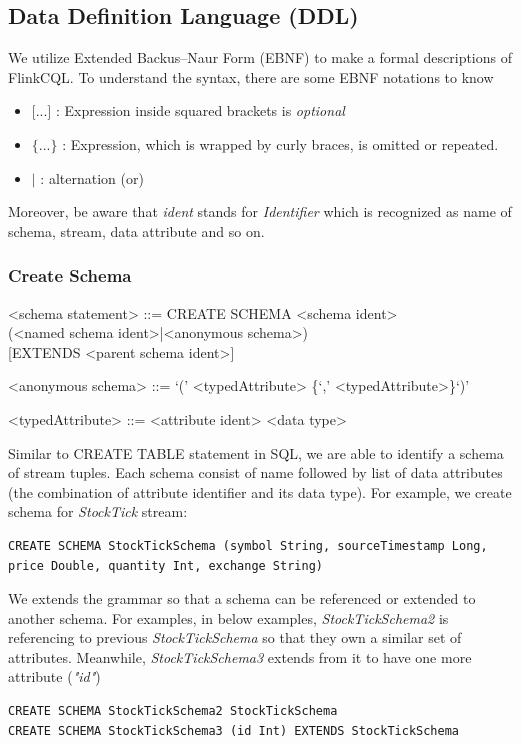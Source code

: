 \subsection{Data Definition Language (DDL)}
We utilize Extended Backus–Naur Form (EBNF) to make a formal descriptions of FlinkCQL. To understand the syntax, there are some EBNF notations to know
\begin{itemize}
	\item $\textbf{[...]}$ : Expression inside squared brackets is \textit{optional}
	\item $\textbf{\{...\}}$ : Expression, which is wrapped by curly braces, is omitted or repeated. 
	\item $\textbf{|}$ : alternation (or)
\end{itemize} 
Moreover, be aware that \textit{ident} stands for \textit{Identifier} which is recognized as name of schema, stream, data attribute and so on.
\subsubsection{Create Schema}

\setlength{\grammarindent}{12em} %

\begin{grammar}

<schema statement> ::= CREATE SCHEMA <schema ident> \\
(<named schema ident>|<anonymous schema>) \\
  { }[EXTENDS <parent schema ident>]

<anonymous schema> ::= `(' <typedAttribute> \{`,' <typedAttribute>\}`)'

<typedAttribute> ::= <attribute ident> <data type>

\end{grammar}
	
Similar to CREATE TABLE statement in SQL, we are able to identify a schema of stream tuples. Each schema consist of name followed by list of data attributes (the combination of attribute identifier and its data type). For example, we create schema for \textit{StockTick} stream:
\begin{verbatim}
CREATE SCHEMA StockTickSchema (symbol String, sourceTimestamp Long, 
price Double, quantity Int, exchange String)
\end{verbatim}

We extends the grammar so that a schema can be referenced or extended to another schema. For examples, in below examples, \textit{StockTickSchema2} is referencing to previous \textit{StockTickSchema} so that they own a similar set of attributes. Meanwhile, \textit{StockTickSchema3} extends from it to have one more attribute (\textit{"id"})
\begin{verbatim}
CREATE SCHEMA StockTickSchema2 StockTickSchema
CREATE SCHEMA StockTickSchema3 (id Int) EXTENDS StockTickSchema
\end{verbatim}

